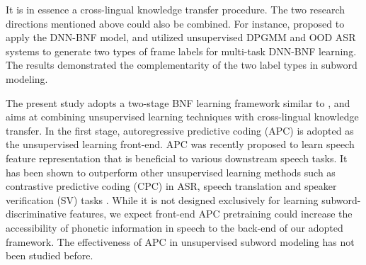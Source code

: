 \documentclass[a4paper]{article}
\begin{document}
{\color{blue}
It is in essence a cross-lingual knowledge transfer procedure.}
The two research directions mentioned above could also be combined.
For instance, \cite{feng2019_TASLP} proposed to 
{\color{blue}
apply the DNN-BNF model, and  utilized  unsupervised   DPGMM  and OOD ASR systems  to  generate two types of frame labels for multi-task DNN-BNF learning. 
The results  demonstrated the complementarity of the two label types in  subword modeling.
}

{\color{blue}The present study  adopts a two-stage BNF learning framework similar to  \cite{Feng2019improving}, and aims at}
combining unsupervised   learning techniques with  cross-lingual   knowledge transfer. 
In the first stage, autoregressive predictive coding (APC) is adopted as the unsupervised learning front-end.
APC was recently proposed \cite{Chung2019} to  learn speech feature representation that is beneficial to   various downstream speech tasks.
It has been shown to outperform other  unsupervised learning methods such as contrastive predictive coding (CPC) \cite{oord2018cpc} 
in ASR, speech translation and speaker verification (SV)  tasks \cite{Chung2019generative}.
While it is not designed exclusively for learning subword-discriminative features, we expect  front-end APC pretraining
could increase the accessibility of phonetic information in speech  to the  back-end of our adopted framework.
The effectiveness of APC in unsupervised subword modeling has not been studied before.
\end{document}
